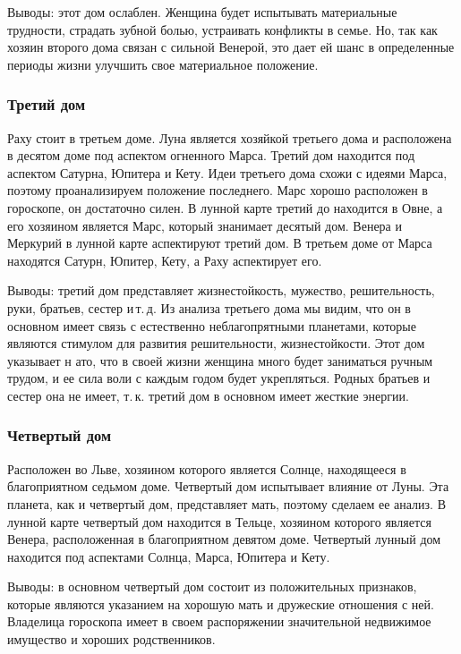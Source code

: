 Выводы: этот дом ослаблен. Женщина будет испытывать материальные трудности, страдать зубной болью, устраивать конфликты в семье. Но, так как хозяин второго дома связан с сильной Венерой, это дает ей шанс в определенные периоды жизни улучшить свое материальное положение.

\subsubsection*{Третий дом}
Раху стоит в третьем доме. Луна является хозяйкой третьего дома и расположена в десятом доме под аспектом огненного Марса. Третий дом находится под аспектом Сатурна, Юпитера и Кету. Идеи третьего дома схожи с идеями Марса, поэтому проанализируем положение последнего. Марс хорошо расположен в гороскопе, он достаточно силен. В лунной карте третий до находится в Овне, а его хозяином является Марс, который знанимает десятый дом. Венера и Меркурий в лунной карте аспектируют третий дом. В третьем доме от Марса находятся Сатурн, Юпитер, Кету, а Раху аспектирует его.

Выводы: третий дом представляет жизнестойкость, мужество, решительность, руки, братьев, сестер и\,т.\,д. Из анализа третьего дома мы видим, что он в основном имеет связь с естественно неблагопрятными планетами, которые являются стимулом для развития решительности, жизнестойкости. Этот дом указывает н ато, что в своей жизни женщина много будет заниматься ручным трудом, и ее сила воли с каждым годом будет укрепляться. Родных братьев и сестер она не имеет, т.\,к. третий дом в основном имеет жесткие энергии.

\subsubsection*{Четвертый дом}
Расположен во Льве, хозяином которого является Солнце, находящееся в благоприятном седьмом доме. Четвертый дом испытывает влияние от Луны. Эта планета, как и четвертый дом, представляет мать, поэтому сделаем ее анализ. В лунной карте четвертый дом находится в Тельце, хозяином которого является Венера, расположенная в благоприятном девятом доме. Четвертый лунный дом находится под аспектами Солнца, Марса, Юпитера и Кету.

Выводы: в основном четвертый дом состоит из положительных признаков, которые являются указанием на хорошую мать и дружеские отношения с ней. Владелица гороскопа имеет в своем распоряжении значительной недвижимое имущество и хороших родственников.

